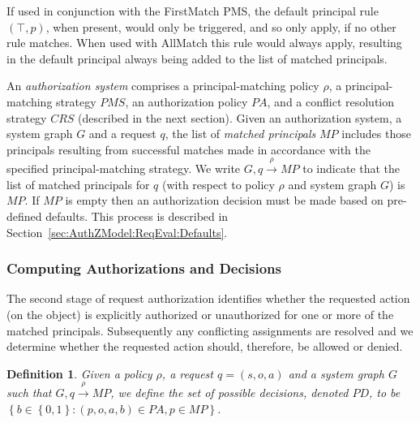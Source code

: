 \documentclass{article}
\newtheorem{definition}{Definition}
\newcommand{\set}[1]{\ensuremath{\left\{#1\right\}}} \newcommand{\sett}[1]{\ensuremath{\left\{\textit{#1}\right\}}} \newcommand{\tuple}[1]{\ensuremath{\left(#1\right)}} \newcommand{\tuplet}[1]{\ensuremath{\left(\textit{#1}\right)}}
\newcommand{\pa}{\mathit{PA}}
\renewcommand{\mp}{\mathit{MP}}
\newcommand{\pms}{\mathit{PMS}}
\newcommand{\crs}{\mathit{CRS}}
\newcommand{\pd}{\mathit{PD}}
\begin{document}
If used in conjunction with the \textsf{FirstMatch} PMS, the default principal rule $(\top,p)$, when present, would only be triggered, and so only apply, if no other rule matches.
When used with \textsf{AllMatch} this rule would always apply, resulting in the default principal always being added to the list of matched principals.

An \emph{authorization system} comprises a principal-matching policy $\rho$, a principal-matching strategy $\pms$, an authorization policy $\pa$, and a conflict resolution strategy $\crs$ (described in the next section).
Given an authorization system, a system graph $G$ and a request $q$, the list of \emph{matched principals} $\mp$ includes those principals resulting from successful matches made in accordance with the specified principal-matching strategy. We write $G,q \xrightarrow{\rho} \mp$ to indicate that the list of matched principals for $q$ (with respect to policy $\rho$ and system graph $G$) is $\mp$.
If $\mp$ is empty then an authorization decision must be made based on pre-defined defaults. This process is described in Section~\ref{sec:AuthZModel:ReqEval:Defaults}.

\subsubsection{Computing Authorizations and Decisions}\label{sec:AuthZModel:ReqEval:S2}
The second stage of request authorization identifies whether the requested action (on the object) is explicitly authorized or unauthorized for one or more of the matched principals. Subsequently any conflicting assignments are resolved and we determine whether the requested action should, therefore, be allowed or denied.

\begin{definition}
    Given a policy $\rho$, a request $q = (s,o,a)$ and a system graph $G$ such that $G,q \xrightarrow{\rho} \mp$, we define the set of \emph{possible decisions}, denoted $\pd$, to be $\set{b \in \set{0,1} : (p,o,a,b) \in \pa,  p \in \mp}$.
\end{definition}
\end{document}
